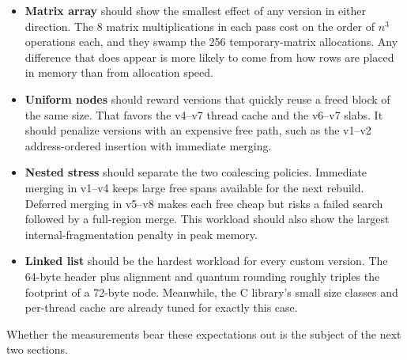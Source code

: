 \begin{itemize}
  \item \textbf{Matrix array} should show the smallest effect of any version
    in either direction.
    The 8 matrix multiplications in each pass cost on the order of $n^{3}$
    operations each, and they swamp the 256 temporary-matrix allocations.
    Any difference that does appear is more likely to come from how rows are
    placed in memory than from allocation speed.
  \item \textbf{Uniform nodes} should reward versions that quickly reuse a
    freed block of the same size.
    That favors the v4--v7 thread cache and the v6--v7 slabs.
    It should penalize versions with an expensive free path, such as the
    v1--v2 address-ordered insertion with immediate merging.
  \item \textbf{Nested stress} should separate the two coalescing policies.
    Immediate merging in v1--v4 keeps large free spans available for the next
    rebuild.
    Deferred merging in v5--v8 makes each free cheap but risks a failed search
    followed by a full-region merge.
    This workload should also show the largest internal-fragmentation penalty
    in peak memory.
  \item \textbf{Linked list} should be the hardest workload for every custom
    version.
    The 64-byte header plus alignment and quantum rounding roughly triples the
    footprint of a 72-byte node.
    Meanwhile, the C library's small size classes and per-thread cache are
    already tuned for exactly this case.
\end{itemize}

Whether the measurements bear these expectations out is the subject of the
next two sections.
